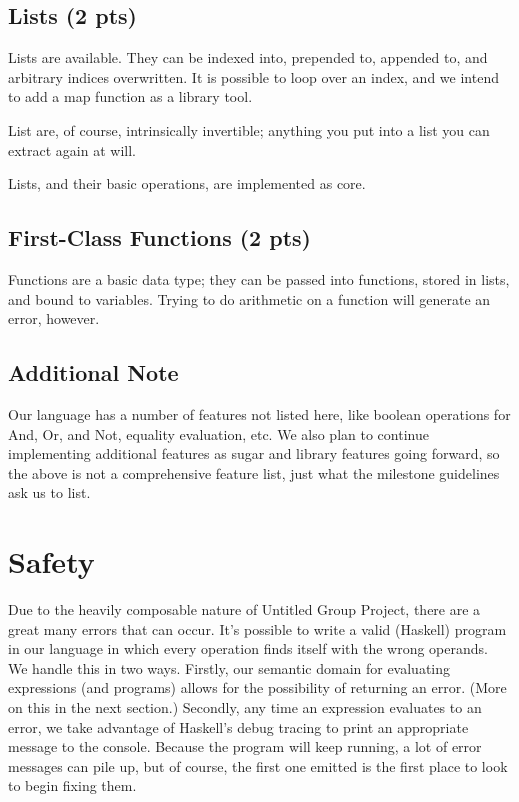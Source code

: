 \documentclass{article}
\begin{document}
\subsection*{Lists (2 pts)}
Lists are available.  They can be indexed into, prepended to, appended to, and arbitrary indices overwritten.  It is possible to loop over an index, and we intend to add a map function as a library tool.

List are, of course, intrinsically invertible; anything you put into a list you can extract again at will.

Lists, and their basic operations, are implemented as core.

\subsection*{First-Class Functions (2 pts)}
Functions are a basic data type; they can be passed into functions, stored in lists, and bound to variables.  Trying to do arithmetic on a function will generate an error, however.

\subsection*{Additional Note}
Our language has a number of features not listed here, like boolean operations for And, Or, and Not, equality evaluation, etc.  We also plan to continue implementing additional features as sugar and library features going forward, so the above is not a comprehensive feature list, just what the milestone guidelines ask us to list.

\section*{Safety}

Due to the heavily composable nature of Untitled Group Project, there are a great many errors that can occur.  It's possible to write a valid (Haskell) program in our language in which every operation finds itself with the wrong operands.  We handle this in two ways.  Firstly, our semantic domain for evaluating expressions (and programs) allows for the possibility of returning an error.  (More on this in the next section.)  Secondly, any time an expression evaluates to an error, we take advantage of Haskell's debug tracing to print an appropriate message to the console.  Because the program will keep running, a lot of error messages can pile up, but of course, the first one emitted is the first place to look to begin fixing them.
\end{document}
